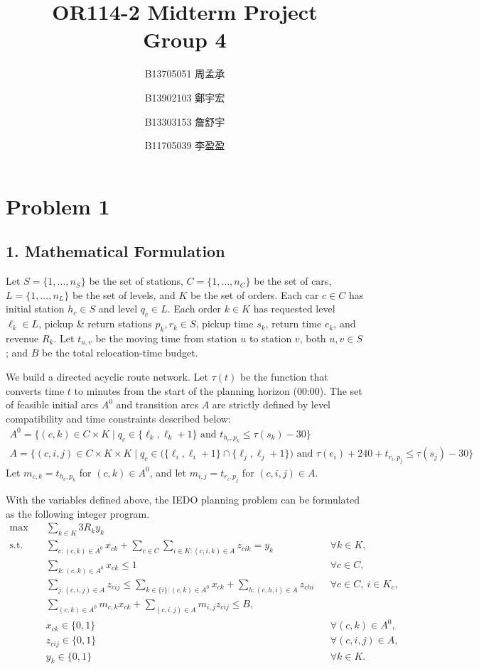 \documentclass[10pt,a4paper]{article}
\title{OR114-2 Midterm Project \\[0.5em] \large Group 4}
\author{
B13705051 周孟承 \and
B13902103 鄭宇宏 \and
B13303153 詹舒宇 \and
B11705039 李盈盈
}
\date{}
\begin{document}
\maketitle

\section*{Problem 1}
\subsection*{1. Mathematical Formulation}

\hspace{2em} Let $S=\{1,..., n_S\}$ be the set of stations, $C=\{1,..., n_C\}$ be the set of cars, $L=\{1, ..., n_L\}$ be the set of levels, and $K$ be the set of orders.  Each car $c\in C$ has initial station $h_c\in S$ and level $q_c\in L$.  Each order $k\in K$ has requested level $\ell_k\in L$, pickup \& return stations $p_k, r_k\in S$, pickup time $s_k$, return time $e_k$, and revenue $R_k$.  Let $t_{u,v}$ be the moving time from station $u$ to station $v$, both $u, v\in S$; and $B$ be the total relocation-time budget.

We build a directed acyclic route network. Let $\tau(t)$ be the function that converts time $t$ to minutes from the start of the planning horizon (00:00). The set of feasible initial arcs $A^0$ and transition arcs $A$ are strictly defined by level compatibility and time constraints described below:
\begin{gather*}
A^0 = \{(c,k)\in C\times K \mid q_c\in\{\ell_k,\ell_k+1\} \text{ and } t_{h_c, p_k}\le \tau(s_k)-30\} \\[0.5em]
A = \Big\{(c, i, j) \in C \times K \times K \;\Big|\; q_c \in \big(\{\ell_i, \ell_i+1\} \cap \{\ell_j, \ell_j+1\}\big) \text{ and } \tau(e_i) + 240 + t_{r_i, p_j} \le \tau(s_j) - 30 \Big\}
\end{gather*}
Let $m_{c,k}=t_{h_c, p_k}$ for $(c,k)\in A^0$, and let $m_{i,j}=t_{r_i, p_j}$ for $(c,i,j)\in A$.

\vspace{5pt}
With the variables defined above, the IEDO planning problem can be formulated as the following integer program.
\[
\begin{aligned}
\max \quad
& \sum_{k\in K} 3 R_k y_k \\
\text{s.t.}\quad
& \sum_{c:(c,k)\in A^0}x_{ck}
  + \sum_{c \in C}\sum_{i \in K:(c,i,k)\in A}z_{cik}
  = y_k
  && \forall k\in K,\\
& \sum_{k:(c,k)\in A^0}x_{ck}\le 1
  && \forall c\in C,\\
& \sum_{j:(c,i,j)\in A}z_{cij}
  \le \sum_{k \in \{i\} : (c,k) \in A^0}x_{ck}+\sum_{h:(c,h,i)\in A}z_{chi}
  && \forall c\in C,\ i\in K_c,\\
& \sum_{(c,k)\in A^0}m_{c,k}x_{ck}
  +\sum_{(c,i,j)\in A}m_{i,j}z_{cij}
  \le B,\\
& x_{ck}\in\{0,1\}
  && \forall (c,k)\in A^0,\\
& z_{cij}\in\{0,1\}
  && \forall (c,i,j)\in A,\\
& y_k\in\{0,1\}
  && \forall k\in K.
\end{aligned}
\]
\end{document}
